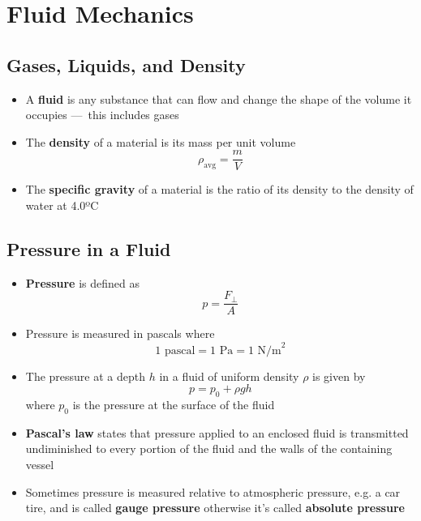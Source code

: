 \documentclass{article}
\begin{document}
\section{Fluid Mechanics}

\subsection{Gases, Liquids, and Density}

\begin{itemize}
    \item A \textbf{fluid} is any substance that can flow and change the shape of the volume it occupies — this includes gases

    \item The \textbf{density} of a material is its mass per unit volume \[\rho_\textrm{avg}=\frac{m}{V}\]

    \item The \textbf{specific gravity} of a material is the ratio of its density to the density of water at 4.0ºC
\end{itemize}

\subsection{Pressure in a Fluid}

\begin{itemize}
    \item \textbf{Pressure} is defined as \[p=\frac{F_\perp}{A}\]

    \item Pressure is measured in pascals where \[1 \textrm{ pascal}=1\textrm{ Pa}=1\textrm{ N/m}^2\]

    \item The pressure at a depth $h$ in a fluid of uniform density $\rho$ is given by \[p=p_0+\rho gh\] where $p_0$ is the pressure at the surface of the fluid

    \item \textbf{Pascal's law} states that pressure applied to an enclosed fluid is transmitted undiminished to every portion of the fluid and the walls of the containing vessel

    \item Sometimes pressure is measured relative to atmospheric pressure, e.g. a car tire, and is called \textbf{gauge pressure} otherwise it's called \textbf{absolute pressure}
\end{itemize}
\end{document}
